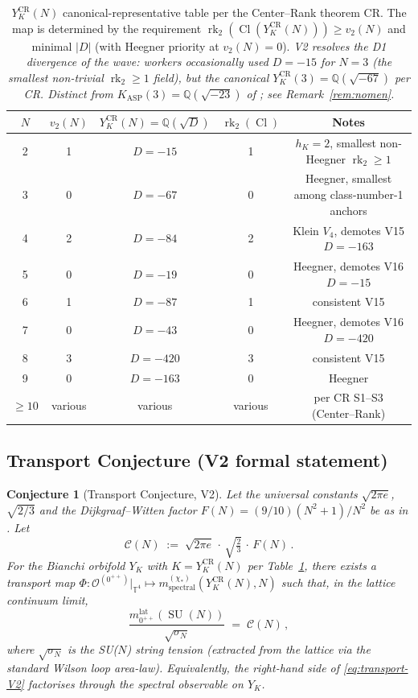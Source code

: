 \documentclass[11pt,a4paper,reqno]{amsart}
\newtheorem{conjecture}[theorem]{Conjecture}
\theoremstyle{definition}
\DeclareMathOperator{\SU}{SU}
\DeclareMathOperator{\Cl}{Cl}
\DeclareMathOperator{\rk}{rk}
\newcommand{\YK}{Y_K}
\newcommand{\KASP}{K_{\mathrm{ASP}}}
\newcommand{\YKCR}{Y_K^{\mathrm{CR}}}
\newcommand{\QQ}{\mathbb{Q}}
\newcommand{\TT}{\mathbb{T}}
\begin{document}
\begin{table}[ht]
\centering
\begin{tabular}{ccccc}
\toprule
$N$ & $v_2(N)$ & $\YKCR(N) = \QQ(\sqrt{D})$ & $\rk_2(\Cl)$ & Notes \\
\midrule
2 & 1 & $D=-15$ & 1 & $h_K = 2$, smallest non-Heegner $\rk_2\ge 1$ \\
3 & 0 & $D=-67$ & 0 & Heegner, smallest among class-number-1 anchors \\
4 & 2 & $D=-84$ & 2 & Klein $V_4$, demotes V15 $D=-163$ \\
5 & 0 & $D=-19$ & 0 & Heegner, demotes V16 $D=-15$ \\
6 & 1 & $D=-87$ & 1 & consistent V15 \\
7 & 0 & $D=-43$ & 0 & Heegner, demotes V16 $D=-420$ \\
8 & 3 & $D=-420$ & 3 & consistent V15 \\
9 & 0 & $D=-163$ & 0 & Heegner \\
$\ge 10$ & various & various & various & per CR S1--S3 (Center--Rank) \\
\bottomrule
\end{tabular}
\caption{$\YKCR(N)$ canonical-representative table per the Center--Rank theorem CR. The map is determined by the requirement $\rk_2(\Cl(\YKCR(N)))\ge v_2(N)$ and minimal $|D|$ (with Heegner priority at $v_2(N)=0$). \emph{V2 resolves the D1 divergence of the wave: workers occasionally used $D=-15$ for $N=3$ (the smallest non-trivial $\rk_2\ge 1$ field), but the canonical $\YKCR(3) = \QQ(\sqrt{-67})$ per CR. Distinct from $\KASP(3) = \QQ(\sqrt{-23})$ of \cite{Remondiere2026KASPmini}; see Remark~\ref{rem:nomen}.}}\label{tab:KASP}
\end{table}

\subsection{Transport Conjecture (V2 formal statement)}\label{ss:conj}

\begin{conjecture}[Transport Conjecture, V2]\label{conj:transport-formal-V2}
Let the universal constants $\sqrt{2\pi e}$, $\sqrt{2/3}$ and the Dijkgraaf--Witten factor $F(N) = (9/10)(N^2+1)/N^2$ be as in \cite{Remondiere2026RouteB}. Let
\[
   \mathcal{C}(N) \;:=\; \sqrt{2\pi e}\,\cdot\,\sqrt{\tfrac{2}{3}}\,\cdot\,F(N)\,.
\]
For the Bianchi orbifold $\YK$ with $K = \YKCR(N)$ per Table~\ref{tab:KASP}, there exists a transport map $\Phi : \mathcal{O}^{(0^{++})}|_{\TT^4} \mapsto m^{(\chi_*)}_{\mathrm{spectral}}(\YKCR(N), N)$ such that, in the lattice continuum limit,
\begin{equation}\label{eq:transport-V2}
   \frac{m_{0^{++}}^{\mathrm{lat}}(\SU(N))}{\sqrt{\sigma_N}}
   \;=\; \mathcal{C}(N)\,,
\end{equation}
where $\sqrt{\sigma_N}$ is the SU($N$) string tension (extracted from the lattice via the standard Wilson loop area-law). Equivalently, the right-hand side of \eqref{eq:transport-V2} factorises through the spectral observable on $\YK$.
\end{conjecture}
\end{document}
